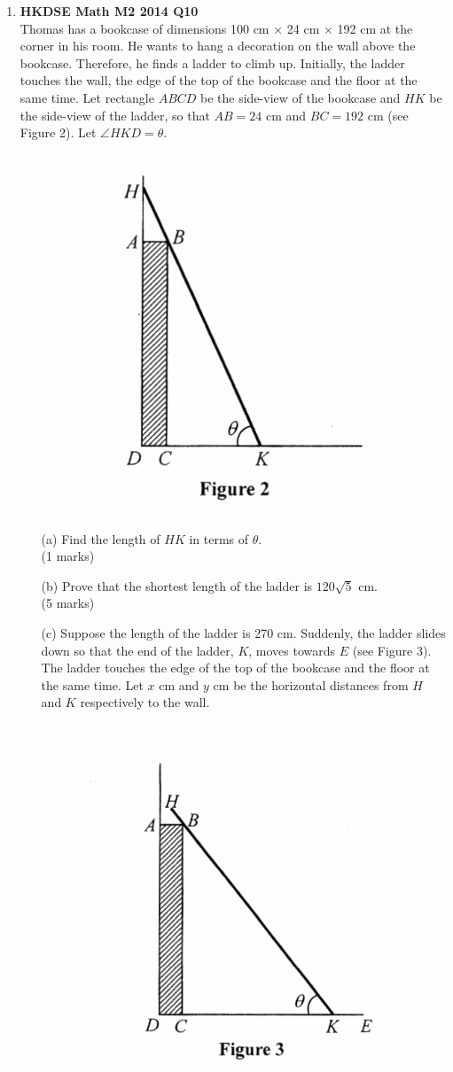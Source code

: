 \documentclass{report}
\begin{document}
\begin{enumerate}
	\item \textbf{HKDSE Math M2 2014 Q10}\\
	Thomas has a bookcase of dimensions 100 cm $\times$ 24 cm $\times$ 192 cm at the corner in his room. He wants to hang a decoration on the wall above the bookcase. Therefore, he finds a ladder to climb up. Initially, the ladder touches the wall, the edge of the top of the bookcase and the floor at the same time. Let rectangle $ABCD$ be the side-view of the bookcase and $HK$ be the side-view of the ladder, so that $AB = 24$ cm and $BC = 192$ cm (see Figure 2). Let $\angle HKD = \theta$. 
	\begin{figure}[H]
		\centering
		\includegraphics[width = .4\linewidth]{2014Figure2}
	\end{figure}
	\begin{enumerate}
		\item [(a)]Find the length of $HK$ in terms of $\theta$. \\(1 marks)
		\item [(b)]Prove that the shortest length of the ladder is $120\sqrt{5}$ cm. \\(5 marks)
		\item [(c)]
		Suppose the length of the ladder is 270 cm. Suddenly, the ladder slides down so that the end of the ladder, $K$, moves towards $E$ (see Figure 3). The ladder touches the edge of the top of the bookcase and the floor at the same time. Let $x$ cm and $y$ cm be the horizontal distances from $H$ and $K$ respectively to the wall.
		\begin{figure}[H]
			\centering
			\includegraphics[width = .4\linewidth]{2014Figure3}

\end{figure}
\end{enumerate}
\end{enumerate}
\end{document}
